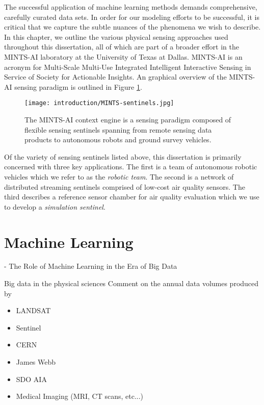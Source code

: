 The successful application of machine learning methods demands comprehensive, carefully curated data sets. In order for our modeling efforts to be successful, it is critical that we capture the subtle nuances of the phenomena we wish to describe. In this chapter, we outline the various physical sensing approaches used throughout this dissertation, all of which are part of a broader effort in the MINTS-AI laboratory at the University of Texas at Dallas. MINTS-AI is an acronym for Multi-Scale Multi-Use Integrated Intelligent Interactive Sensing in Service of Society for Actionable Insights. An graphical overview of the MINTS-AI sensing paradigm is outlined in Figure \ref{fig:mints-ai}.

\begin{figure}[!hbt]
  \centering
  \texttt{[image: introduction/MINTS-sentinels.jpg]}
  \caption{The MINTS-AI context engine is a sensing paradigm composed of flexible sensing sentinels spanning from remote sensing data products to autonomous robots and ground survey vehicles.}
  \label{fig:mints-ai}
\end{figure}

Of the variety of sensing sentinels listed above, this dissertation is primarily concerned with three key applications. The first is a team of autonomous robotic vehicles which we refer to as the \textit{robotic team}. The second is a network of distributed streaming sentinels comprised of low-cost air quality sensors. The third describes a reference sensor chamber for air quality evaluation which we use to develop a \textit{simulation sentinel}.






\section{Machine Learning}

- The Role of Machine Learning in the Era of Big Data

Big data in the physical sciences
Comment on the annual data volumes produced by
\begin{itemize}
  \item LANDSAT
  \item Sentinel
  \item CERN
  \item James Webb
  \item SDO AIA
  \item Medical Imaging (MRI, CT scans, etc...)
\end{itemize}

